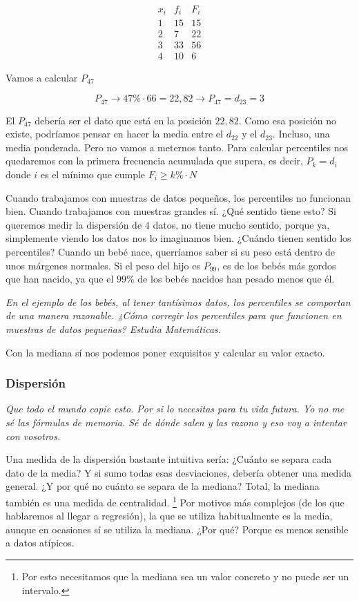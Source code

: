 \[
\begin{array}{c|c|c}
x_i & f_i&F_i\\\hline
1&15&15\\
2&7&22\\
3&33&56\\
4&10&6
\end{array}
\]

Vamos a calcular $P_{47}$

\[
P_{47} \to 47\% · 66 = 22,82 \to P_{47} = d_{23} = 3
\]

El $P_{47}$ debería ser el dato que está en la posición $22,82$. Como esa posición no existe, podríamos pensar en hacer la media entre el $d_{22}$ y el $d_{23}$. Incluso, una media ponderada. Pero no vamos a meternos tanto. 
%
Para calcular percentiles nos quedaremos con la primera frecuencia acumulada que supera, es decir, $\displaystyle P_k = d_{i}$ donde $i$ es el mínimo que cumple $F_i\geq k\%·N$

Cuando trabajamos con muestras de datos pequeños, los percentiles no funcionan bien. Cuando trabajamos con muestras grandes sí. ¿Qué sentido tiene esto? 
%
Si queremos medir la dispersión de 4 datos, no tiene mucho sentido, porque ya, simplemente viendo los datos nos lo imaginamos bien. 
%
¿Cuándo tienen sentido los percentiles? 
%
Cuando un bebé nace, querríamos saber si su peso está dentro de unos márgenes normales. 
%
Si el peso del hijo es $P_{99}$, es de los bebés más gordos que han nacido, ya que el $99\%$ de los bebés nacidos han pesado menos que él. 

\textit{En el ejemplo de los bebés, al tener tantísimos datos, los percentiles se comportan de una manera razonable. ¿Cómo corregir los percentiles para que funcionen en muestras de datos pequeñas? Estudia Matemáticas.}

\obs Con la mediana sí nos podemos poner exquisitos y calcular su valor exacto.

\subsubsection{Dispersión}

\textit{Que todo el mundo copie esto. Por si lo necesitas para tu vida futura. Yo no me sé las fórmulas de memoria. Sé de dónde salen y las razono y eso voy a intentar con vosotros.}

Una medida de la dispersión bastante intuitiva sería: ¿Cuánto se separa cada dato de la media? Y si sumo todas esas desviaciones, debería obtener una medida general. ¿Y por qué no cuánto se separa de la mediana? Total, la mediana también es una medida de centralidad. \footnote{Por esto necesitamos que la mediana sea un valor concreto y no puede ser un intervalo.}
%
Por motivos más complejos (de los que hablaremos al llegar a regresión), la que se utiliza habitualmente es la media, aunque en ocasiones sí se utiliza la mediana. ¿Por qué? Porque es menos sensible a datos atípicos.

